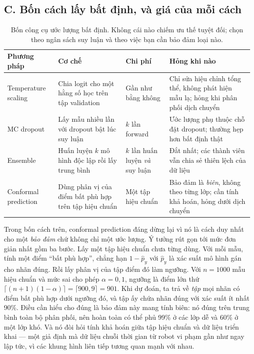 \documentclass[../../deep_learning.tex]{subfiles}
\begin{document}
\subsection{C. Bốn cách lấy bất định, và giá của mỗi cách}
\begin{table}[H]\centering\footnotesize
\caption{Bốn công cụ ước lượng bất định. Không cái nào chiếm ưu thế tuyệt đối; chọn theo ngân sách suy luận và theo việc bạn cần bảo đảm loại nào.}
\label{tab:bat-dinh}
\begin{tabularx}{\linewidth}{@{}L{2.5cm}YL{2.2cm}L{3.3cm}@{}}
\toprule
\textbf{Phương pháp} & \textbf{Cơ chế} & \textbf{Chi phí} & \textbf{Hỏng khi nào}\\
\midrule
Temperature scaling & Chia logit cho một hằng số học trên tập validation & Gần như bằng không & Chỉ sửa hiệu chỉnh tổng thể, không phát hiện mẫu lạ; hỏng khi phân phối dịch chuyển \cite{ovadia2019can}\\
MC dropout & Lấy mẫu nhiều lần với dropout bật lúc suy luận \cite{gal2016dropout} & \(k\) lần forward & Ước lượng phụ thuộc chỗ đặt dropout; thường hẹp hơn bất định thật\\
Ensemble & Huấn luyện \(k\) mô hình độc lập rồi lấy trung bình \cite{lakshminarayanan2017simple} & \(k\) lần huấn luyện \emph{và} suy luận & Đắt nhất; các thành viên vẫn chia sẻ thiên lệch của dữ liệu\\
Conformal prediction & Dùng phân vị của điểm bất phù hợp trên tập hiệu chuẩn \cite{angelopoulos2023conformal} & Một tập hiệu chuẩn & Bảo đảm là \emph{biên}, không theo từng lớp; cần tính khả hoán, hỏng dưới dịch chuyển\\
\bottomrule
\end{tabularx}
\end{table}

Trong bốn cách trên, conformal prediction đáng dừng lại vì nó là cách duy nhất cho một \emph{bảo đảm} chứ không chỉ một ước lượng. Ý tưởng rút gọn tới mức đơn giản nhất gồm ba bước. Lấy một tập hiệu chuẩn chưa từng dùng. Với mỗi mẫu, tính một điểm ``bất phù hợp'', chẳng hạn \(1-\hat p_{y}\) với \(\hat p_y\) là xác suất mô hình gán cho nhãn đúng. Rồi lấy phân vị của tập điểm đó làm ngưỡng. Với \(n = 1000\) mẫu hiệu chuẩn và mức sai cho phép \(\alpha = 0{,}1\), ngưỡng là điểm lớn thứ \(\lceil (n+1)(1-\alpha) \rceil = \lceil 900{,}9 \rceil = 901\). Khi dự đoán, ta trả về \emph{tập} mọi nhãn có điểm bất phù hợp dưới ngưỡng đó, và tập ấy chứa nhãn đúng với xác suất ít nhất 90\%. Điều cần hiểu cho đúng là bảo đảm này mang tính biên: nó đúng trên trung bình toàn bộ phân phối, nên hoàn toàn có thể phủ 99\% ở các lớp dễ và 60\% ở một lớp khó. Và nó đòi hỏi tính khả hoán giữa tập hiệu chuẩn và dữ liệu triển khai --- một giả định mà dữ liệu chuỗi thời gian từ robot vi phạm gần như ngay lập tức, vì các khung hình liên tiếp tương quan mạnh với nhau.
\end{document}
